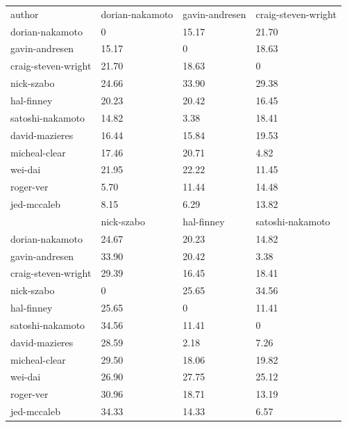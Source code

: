 \documentclass{article}%
\begin{document}
\begin{table}[]
\begin{tabular}{llll}
author              & dorian-nakamoto & gavin-andresen & craig-steven-wright \\
dorian-nakamoto     & 0               & 15.17    & 21.70         \\
gavin-andresen      & 15.17     & 0              & 18.63        \\
craig-steven-wright & 21.70    & 18.63    & 0                   \\
nick-szabo          & 24.66     & 33.90    & 29.38         \\
hal-finney          & 20.23     & 20.42   & 16.45        \\
satoshi-nakamoto    & 14.82     & 3.38    & 18.41         \\
david-mazieres      & 16.44     & 15.84     & 19.53         \\
micheal-clear       & 17.46     & 20.71     & 4.82          \\
wei-dai             & 21.95     & 22.22  & 11.45        \\
roger-ver           & 5.70    & 11.44    & 14.48        \\
jed-mccaleb         & 8.15     & 6.29    & 13.82        \\
                    & nick-szabo      & hal-finney     & satoshi-nakamoto    \\
dorian-nakamoto     & 24.67    & 20.23    & 14.82         \\
gavin-andresen      & 33.90     & 20.42    & 3.38       \\
craig-steven-wright & 29.39     & 16.45    & 18.41         \\
nick-szabo          & 0               & 25.65   & 34.56         \\
hal-finney          & 25.65     & 0              & 11.41         \\
satoshi-nakamoto    & 34.56     & 11.41    & 0                   \\
david-mazieres      & 28.59   & 2.18 & 7.26         \\
micheal-clear       & 29.50   & 18.06    & 19.82          \\
wei-dai             & 26.90    & 27.75    & 25.12         \\
roger-ver           & 30.96     & 18.71   & 13.19         \\
jed-mccaleb         & 34.33   & 14.33    & 6.57         \\

\end{tabular}
\end{table}
\end{document}
